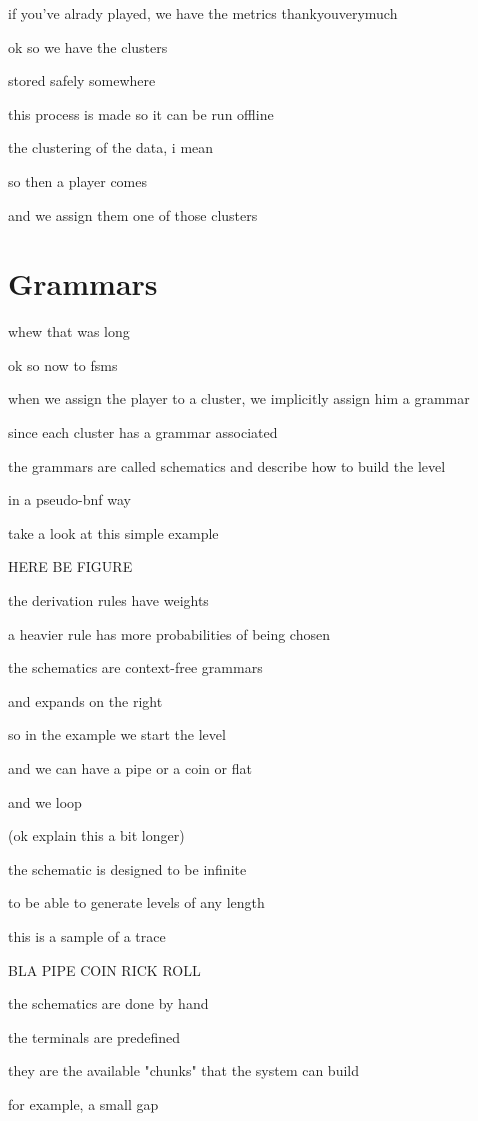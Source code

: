 \documentclass[conference]{IEEEtran}
\begin{document}
if you've alrady played, we have the metrics thankyouverymuch

ok so we have the clusters

stored safely somewhere

this process is made so it can be run offline

the clustering of the data, i mean

so then a player comes

and we assign them one of those clusters

\section{Grammars}

whew that was long

ok so now to fsms

when we assign the player to a cluster, we implicitly assign him a grammar

since each cluster has a grammar associated

the grammars are called schematics and describe how to build the level

in a pseudo-bnf way

take a look at this simple example

HERE BE FIGURE

the derivation rules have weights

a heavier rule has more probabilities of being chosen

the schematics are context-free grammars

and expands on the right

so in the example we start the level

and we can have a pipe or a coin or flat

and we loop

(ok explain this a bit longer)

the schematic is designed to be infinite

to be able to generate levels of any length

this is a sample of a trace

BLA PIPE COIN RICK ROLL

the schematics are done by hand

the terminals are predefined

they are the available "chunks" that the system can build

for example, a small gap
\end{document}
